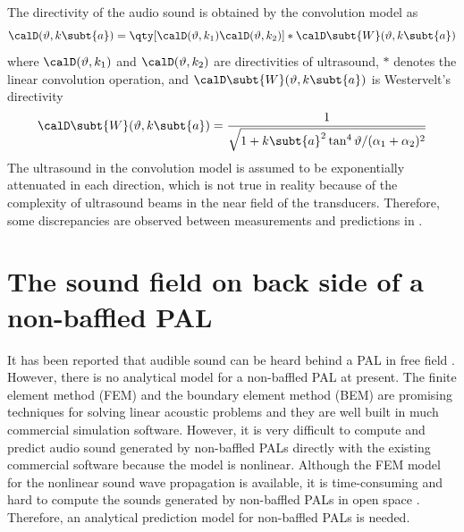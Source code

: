 The directivity of the audio sound is obtained by the convolution model as
\begin{equation}
    \calD(\vartheta,k\subt{a})
    =
    \qty[\calD(\vartheta,k_1) \calD(\vartheta,k_2)]
    \ast
    \calD\subt{W} (\vartheta,k\subt{a})
    \label{eq:conv}
\end{equation}
where $\calD(\vartheta,k_1)$ and $\calD(\vartheta,k_2)$ are directivities of ultrasound, 
$\ast$ denotes the linear convolution operation,
and $\calD\subt{W}(\vartheta,k\subt{a})$ is Westervelt's directivity \cite{Westervelt1963ParametricAcousticArray}
\begin{equation}
    \calD\subt{W}(\vartheta,k\subt{a})
    =
    \frac{1}{\sqrt{1+k\subt{a}^2 \tan^4 \vartheta / (\alpha_1+\alpha_2)^2 }}
\end{equation}
The ultrasound in the convolution model is assumed to be exponentially attenuated in each direction, which is not true in reality because of the complexity of ultrasound beams in the near field of the transducers. Therefore, some discrepancies are observed between measurements and predictions in \cite{Shi2015ConvolutionModelComputing}.

\section{The sound field on back side of  a non-baffled PAL}
\label{eq:sound_field_back}
It has been reported that audible sound can be heard behind a PAL in free field \cite{Sugahara2017StudyMeasurementsAbsorption}.
However, there is no analytical model for a non-baffled PAL at present.
The finite element method (FEM) and the boundary element method (BEM) are promising techniques for solving linear acoustic problems and they are well built in much commercial simulation software. 
However, it is very difficult to compute and predict audio sound generated by non-baffled PALs directly with the existing commercial software because the model is nonlinear. 
Although the FEM model for the nonlinear sound wave propagation is available, it is time-consuming and hard to compute the sounds generated by non-baffled PALs in open space \cite{Kagawa1992FiniteElementSimulation}. 
Therefore, an analytical prediction model for non-baffled PALs is needed.

